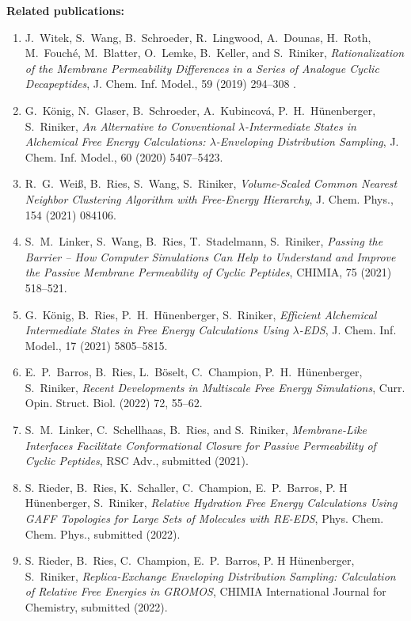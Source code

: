\newpage
\noindent \textbf{Related publications:}
\begin{enumerate}
    \item J.\ Witek, S.\ Wang, B.\ Schroeder, R.\ Lingwood, A.\ Dounas, H.\ Roth, M.\ Fouché, M.\ Blatter, O.\ Lemke, B.\ Keller, and S.\ Riniker, \textit{Rationalization of the Membrane Permeability Differences in a Series of Analogue Cyclic Decapeptides}, {J. Chem. Inf. Model.}, {59} (2019) 294--308 .
    \item  G.\ K\"onig, N.\ Glaser, B.\ Schroeder, A.\ Kubincová, P.\ H.\ H\"unenberger, S.\ Riniker, \textit{An Alternative to Conventional $\lambda$-Intermediate States in Alchemical Free Energy Calculations: $\lambda$-Enveloping Distribution Sampling}, {J. Chem. Inf. Model.}, {60} (2020) 5407--5423.
    \item R.\ G.\ Wei\ss, B.\ Ries, S.\ Wang, S.\ Riniker, \textit{Volume-Scaled Common Nearest Neighbor Clustering Algorithm with Free-Energy Hierarchy}, {J. Chem. Phys.}, {154} (2021) 084106.
    \item S.\ M.\ Linker, S.\ Wang, B.\ Ries, T.\ Stadelmann, S.\ Riniker, \textit{Passing the Barrier – How Computer Simulations Can Help to Understand and Improve the Passive Membrane Permeability of Cyclic Peptides}, {CHIMIA}, {75} (2021) 518--521.
    \item G.\ K\"onig, B.\ Ries, P.\ H.\ H\"unenberger, S.\ Riniker, \textit{Efficient Alchemical Intermediate States in Free Energy Calculations Using  $\lambda$-EDS}, {J. Chem. Inf. Model.}, {17} (2021) 5805--5815.
    \item E.\ P.\ Barros, B.\ Ries, L.\ B\"oselt, C.\ Champion, P.\ H.\ H\"unenberger, S.\ Riniker, \textit{Recent Developments in Multiscale Free Energy Simulations}, {Curr. Opin. Struct. Biol.} (2022) {72}, 55--62.
    \item S.\ M.\ Linker, C.\ Schellhaas, B.\ Ries, and S.\ Riniker,\textit{ Membrane-Like Interfaces Facilitate Conformational Closure for Passive Permeability of Cyclic Peptides}, {RSC Adv.}, submitted (2021).

    \item S. Rieder, B.\ Ries, K.\ Schaller, C.\ Champion,  E.\ P.\ Barros, P. H H\"unenberger,  S.\ Riniker, \textit{Relative Hydration Free Energy Calculations Using GAFF Topologies for Large Sets of Molecules with RE-EDS},  {Phys. Chem. Chem. Phys.}, submitted (2022).
        
    \item S. Rieder, B.\ Ries, C.\ Champion,  E.\ P.\ Barros, P. H H\"unenberger,  S.\ Riniker, \textit{Replica-Exchange Enveloping Distribution Sampling: Calculation of Relative Free Energies in GROMOS}, { CHIMIA International Journal for Chemistry}, submitted (2022).
    
\end{enumerate}
